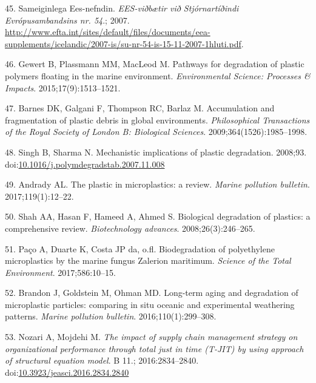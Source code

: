 \documentclass[icelandic,]{book}
\begin{document}
\leavevmode\hypertarget{ref-SameiginlegaEes-nefndin2007}{}%
45. Sameiginlega Ees-nefndin. \emph{EES-viðbætir við Stjórnartíðindi Evrópusambandsins nr. 54}.; 2007. \url{http://www.efta.int/sites/default/files/documents/eea-supplements/icelandic/2007-is/su-nr-54-is-15-11-2007-1hluti.pdf}.

\leavevmode\hypertarget{ref-gewert2015pathways}{}%
46. Gewert B, Plassmann MM, MacLeod M. Pathways for degradation of plastic polymers floating in the marine environment. \emph{Environmental Science: Processes \& Impacts}. 2015;17(9):1513--1521.

\leavevmode\hypertarget{ref-barnes2009accumulation}{}%
47. Barnes DK, Galgani F, Thompson RC, Barlaz M. Accumulation and fragmentation of plastic debris in global environments. \emph{Philosophical Transactions of the Royal Society of London B: Biological Sciences}. 2009;364(1526):1985--1998.

\leavevmode\hypertarget{ref-Singh2008}{}%
48. Singh B, Sharma N. Mechanistic implications of plastic degradation. 2008;93. doi:\href{https://doi.org/10.1016/j.polymdegradstab.2007.11.008}{10.1016/j.polymdegradstab.2007.11.008}

\leavevmode\hypertarget{ref-andrady2017plastic}{}%
49. Andrady AL. The plastic in microplastics: a review. \emph{Marine pollution bulletin}. 2017;119(1):12--22.

\leavevmode\hypertarget{ref-shah2008biological}{}%
50. Shah AA, Hasan F, Hameed A, Ahmed S. Biological degradation of plastics: a comprehensive review. \emph{Biotechnology advances}. 2008;26(3):246--265.

\leavevmode\hypertarget{ref-pacco2017biodegradation}{}%
51. Paço A, Duarte K, Costa JP da, o.fl. Biodegradation of polyethylene microplastics by the marine fungus Zalerion maritimum. \emph{Science of the Total Environment}. 2017;586:10--15.

\leavevmode\hypertarget{ref-brandon2016long}{}%
52. Brandon J, Goldstein M, Ohman MD. Long-term aging and degradation of microplastic particles: comparing in situ oceanic and experimental weathering patterns. \emph{Marine pollution bulletin}. 2016;110(1):299--308.

\leavevmode\hypertarget{ref-Nozari2016}{}%
53. Nozari A, Mojdehi M. \emph{The impact of supply chain management strategy on organizational performance through total just in time (T-JIT) by using approach of structural equation model}. B 11.; 2016:2834--2840. doi:\href{https://doi.org/10.3923/jeasci.2016.2834.2840}{10.3923/jeasci.2016.2834.2840}
\end{document}
